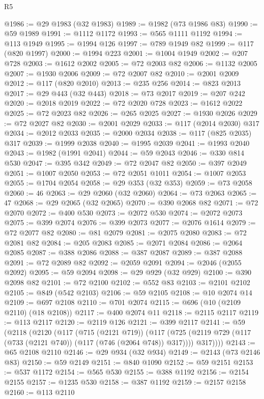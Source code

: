 \begin{lexlean}{R5}
\begin{coremodule}
{{{{{{{{{{{{{{{{{{{{{{{{{{{{{{{{{{{{{{{{{{{{{{{{{{{{{{{{{{{{{{{{{{{{{{{{{{{{{{{{{{{{{{{{{{{{@1986 := @29 @1983 (@32 @1983)
@1989 := @1982 (@73 @1986 @83)
@1990 := @59 @1989
@1991 := @1112 @1172
@1993 := @565 @1111 @1192
@1994 := @113 @1949
@1995 := @1994 @126
@1997 := @789 @1949 @82
@1999 := @117 (@820 @1997)
@2000 := @1994 @223
@2001 := @1004 @1949
@2002 := @207 @728
@2003 := @1612 @2002
@2005 := @72 @2003 @82
@2006 := @1132 @2005
@2007 := @1930 @2006
@2009 := @72 @2007 @82
@2010 := @2001 @2009
@2012 := @117 (@820 @2010)
@2013 := @235 @256
@2014 := @823 @2013
@2017 := @29 @443 (@32 @443)
@2018 := @73 @2017
@2019 := @207 @242
@2020 := @2018 @2019
@2022 := @72 @2020 @728
@2023 := @1612 @2022
@2025 := @72 @2023 @82
@2026 := @265 @2025
@2027 := @1930 @2026
@2029 := @72 @2027 @82
@2030 := @2001 @2029
@2033 := @117 (@2014 @2030) @317
@2034 := @2012 @2033
@2035 := @2000 @2034
@2038 := @117 (@825 @2035) @317
@2039 := @1999 @2038
@2040 := @1995 @2039
@2041 := @1993 @2040
@2043 := @1982 (@1991 @2041)
@2044 := @59 @2043
@2046 := @330 @814 @530
@2047 := @395 @342
@2049 := @72 @2047 @82
@2050 := @397 @2049
@2051 := @1007 @2050
@2053 := @72 @2051 @1011
@2054 := @1007 @2053
@2055 := @1704 @2054
@2058 := @29 @353 (@32 @353)
@2059 := @73 @2058
@2060 := 46
@2063 := @29 @2060 (@32 @2060)
@2064 := @73 @2063
@2065 := 47
@2068 := @29 @2065 (@32 @2065)
@2070 := @390 @2068 @82
@2071 := @72 @2070
@2072 := @400 @530
@2073 := @2072 @530
@2074 := @2072 @2073
@2075 := @399 @2074
@2076 := @399 @2073
@2077 := @2076 @1614
@2079 := @72 @2077 @82
@2080 := @81 @2079
@2081 := @2075 @2080
@2083 := @72 @2081 @82
@2084 := @205 @2083
@2085 := @2071 @2084
@2086 := @2064 @2085
@2087 := @388 @2086
@2088 := @387 @2087
@2089 := @387 @2088
@2091 := @72 @2089 @82
@2092 := @2059 @2091
@2094 := @2046 (@2055 @2092)
@2095 := @59 @2094
@2098 := @29 @929 (@32 @929)
@2100 := @390 @2098 @82
@2101 := @72 @2100
@2102 := @552 @83
@2103 := @2101 @2102
@2105 := @849 (@542 @2103)
@2106 := @59 @2105
@2108 := @10 @2074 @14
@2109 := @697 @2108
@2110 := @701 @2074
@2115 := @696 (@10 (@2109 @2110) (@18 @2108))
@2117 := @400 @2074 @11
@2118 := @2115 @2117
@2119 := @113 @2117
@2120 := @2119 @126
@2121 := @399 @2117
@2141 := @59
    (@2118
      (@2120
        (@117
          (@715 (@2121 @719))
          (@117
            (@725 (@2119 @729 (@117 (@733 (@2121 @740)) (@117 (@746 (@2064 @748)) @317))))
            @317))))
@2143 := @65 @2108 @2110
@2146 := @29 @934 (@32 @934)
@2149 := @2143 (@73 @2146 @83)
@2150 := @59 @2149
@2151 := @840 @1090
@2152 := @59 @2151
@2153 := @537 @1172
@2154 := @565 @530
@2155 := @388 @1192
@2156 := @2154 @2155
@2157 := @1235 @530
@2158 := @387 @1192
@2159 := @2157 @2158
@2160 := @113 @2110
}}}}}}}}}}}}}}}}}}}}}}}}}}}}}}}}}}}}}}}}}}}}}}}}}}}}}}}}}}}}}}}}}}}}}}}}}}}}}}}}}}}}}}}}}}}}
\end{coremodule}
\end{lexlean}
